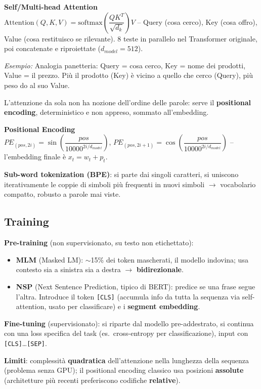 \documentclass[11pt,a4paper]{article}
\newcommand{\formula}[2]{\begin{formulabox}\textbf{#1}\\[3pt]#2\end{formulabox}}
\newcommand{\es}[1]{\begin{esbox}\textit{Esempio:} #1\end{esbox}}
\begin{document}
\formula{Self/Multi-head Attention}{$\mathrm{Attention}(Q,K,V) = \mathrm{softmax}\!\left(\dfrac{QK^T}{\sqrt{d_k}}\right)V$ -- Query (cosa cerco), Key (cosa offro), Value (cosa restituisco se rilevante). 8 teste in parallelo nel Transformer originale, poi concatenate e riproiettate ($d_{model}=512$).}
\es{Analogia panetteria: Query = cosa cerco, Key = nome dei prodotti, Value = il prezzo. Pi\`u il prodotto (Key) \`e vicino a quello che cerco (Query), pi\`u peso do al suo Value.}

L'attenzione da sola non ha nozione dell'ordine delle parole: serve il \textbf{positional encoding}, deterministico e non appreso, sommato all'embedding.
\formula{Positional Encoding}{$PE_{(pos,2i)} = \sin\!\left(\dfrac{pos}{10000^{2i/d_{model}}}\right)$, \quad $PE_{(pos,2i+1)} = \cos\!\left(\dfrac{pos}{10000^{2i/d_{model}}}\right)$ -- l'embedding finale \`e $x_t = w_t + p_t$.}

\textbf{Sub-word tokenization (BPE)}: si parte dai singoli caratteri, si uniscono iterativamente le coppie di simboli pi\`u frequenti in nuovi simboli $\to$ vocabolario compatto, robusto a parole mai viste.

\subsection*{Training}
\textbf{Pre-training} (non supervisionato, su testo non etichettato):
\begin{itemize}
  \item \textbf{MLM} (Masked LM): $\sim$15\% dei token mascherati, il modello indovina; usa contesto sia a sinistra sia a destra $\to$ \textbf{bidirezionale}.
  \item \textbf{NSP} (Next Sentence Prediction, tipico di BERT): predice se una frase segue l'altra. Introduce il token \texttt{[CLS]} (accumula info da tutta la sequenza via self-attention, usato per classificare) e i \textbf{segment embedding}.
\end{itemize}
\textbf{Fine-tuning} (supervisionato): si riparte dal modello pre-addestrato, si continua con una loss specifica del task (es.\ cross-entropy per classificazione), input con \texttt{[CLS]}\ldots\texttt{[SEP]}.

\textbf{Limiti}: complessit\`a \textbf{quadratica} dell'attenzione nella lunghezza della sequenza (problema senza GPU); il positional encoding classico usa posizioni \textbf{assolute} (architetture pi\`u recenti preferiscono codifiche \textbf{relative}).
\end{document}
